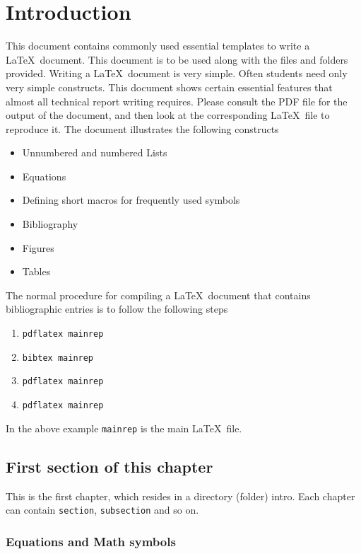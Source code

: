 
\newcommand{\etas}{\ensuremath{\eta_{\mathrm{s}}}}


\chapter{Introduction}


This document contains commonly used essential templates to write a
\LaTeX\ document. This document is to be used along with the files and
folders provided. Writing a \LaTeX\ document is very simple.  Often
students need only very simple constructs.  This document shows
certain essential features that almost all technical report writing
requires. Please consult the PDF file for the output of the document,
and then look at the corresponding \LaTeX\ file to reproduce it.  The
document illustrates the following constructs
\begin{itemize}
\item Unnumbered and numbered Lists
\item Equations
\item Defining short macros for frequently used symbols
\item Bibliography
\item Figures
\item Tables
\end{itemize}

The normal procedure for compiling a \LaTeX\ document that contains
bibliographic entries is to follow the following steps
\begin{enumerate}
\item \verb|pdflatex mainrep|
\item \verb|bibtex mainrep|
\item \verb|pdflatex mainrep|
\item \verb|pdflatex mainrep|
\end{enumerate}
In the above example \verb|mainrep| is the main \LaTeX\ file.


\section{First section of this chapter}

This is the first chapter, which resides in a directory (folder)
intro. Each chapter can contain \verb|section|, \verb|subsection|
and so on.

\subsection{Equations and Math symbols}


